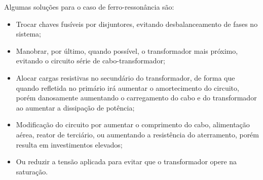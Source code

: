 Algumas soluções para o caso de ferro-ressonância são:

\begin{itemize}
    \item Trocar chaves fusíveis por disjuntores, evitando desbalanceamento de fases no sistema;
    \item Manobrar, por último, quando possível, o transformador mais próximo, evitando o circuito série de cabo-transformador;
    \item Alocar cargas resistivas no secundário do transformador, de forma que quando refletida no primário irá aumentar o amortecimento do circuito, porém danosamente aumentando o carregamento do cabo e do transformador ao aumentar a dissipação de potência;
    \item Modificação do circuito por aumentar o comprimento do cabo, alimentação aérea, reator de terciário, ou aumentando a resistência do aterramento, porém resulta em investimentos elevados;
    \item Ou reduzir a tensão aplicada para evitar que o transformador opere na saturação.
\end{itemize}